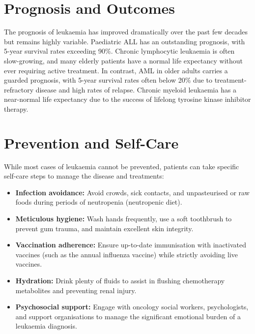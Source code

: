 \section*{Prognosis and Outcomes}
The prognosis of leukaemia has improved dramatically over the past few decades but remains highly variable. Paediatric ALL has an outstanding prognosis, with 5-year survival rates exceeding 90\%. Chronic lymphocytic leukaemia is often slow-growing, and many elderly patients have a normal life expectancy without ever requiring active treatment. In contrast, AML in older adults carries a guarded prognosis, with 5-year survival rates often below 20\% due to treatment-refractory disease and high rates of relapse. Chronic myeloid leukaemia has a near-normal life expectancy due to the success of lifelong tyrosine kinase inhibitor therapy.

\section*{Prevention and Self-Care}
While most cases of leukaemia cannot be prevented, patients can take specific self-care steps to manage the disease and treatments:
\begin{itemize}
    \item \textbf{Infection avoidance:} Avoid crowds, sick contacts, and unpasteurised or raw foods during periods of neutropenia (neutropenic diet).
    \item \textbf{Meticulous hygiene:} Wash hands frequently, use a soft toothbrush to prevent gum trauma, and maintain excellent skin integrity.
    \item \textbf{Vaccination adherence:} Ensure up-to-date immunisation with inactivated vaccines (such as the annual influenza vaccine) while strictly avoiding live vaccines.
    \item \textbf{Hydration:} Drink plenty of fluids to assist in flushing chemotherapy metabolites and preventing renal injury.
    \item \textbf{Psychosocial support:} Engage with oncology social workers, psychologists, and support organisations to manage the significant emotional burden of a leukaemia diagnosis.
\end{itemize}

